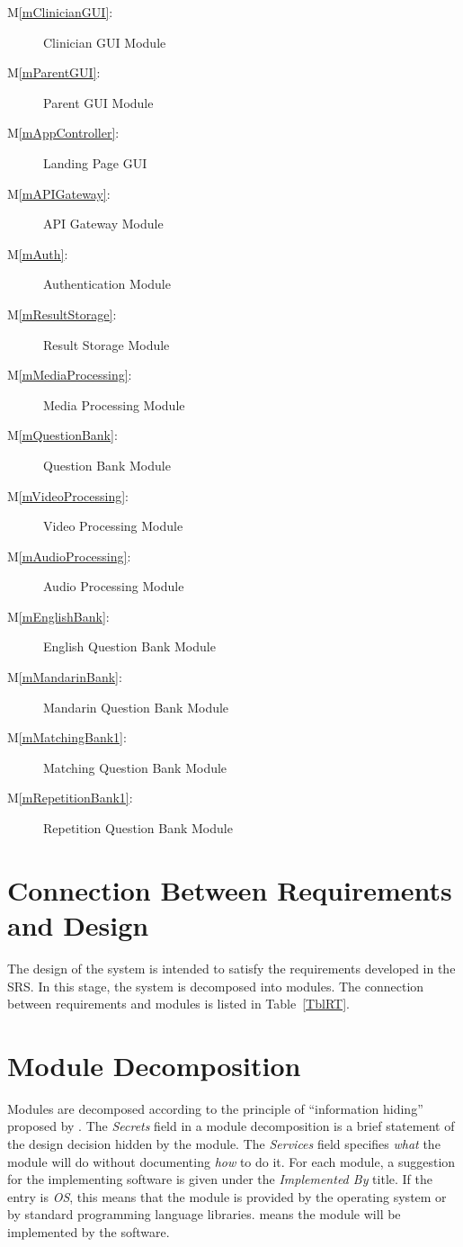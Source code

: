 \documentclass[12pt, titlepage]{article}
\newcommand{\mref}[1]{M\ref{#1}}
\begin{document}
\begin{multicols}{2}
  \begin{description}
    \item [\mref{mClinicianGUI}:] Clinician GUI Module
    \item [\mref{mParentGUI}:]   Parent GUI Module
    \item [\mref{mAppController}:] Landing Page GUI
    \item [\mref{mAPIGateway}:]  API Gateway Module
    \item [\mref{mAuth}:]        Authentication Module
    \item [\mref{mResultStorage}:] Result Storage Module
    \item [\mref{mMediaProcessing}:] Media Processing Module
    \item [\mref{mQuestionBank}:] Question Bank Module
    \item [\mref{mVideoProcessing}:] Video Processing Module
    \item [\mref{mAudioProcessing}:] Audio Processing Module
    \item [\mref{mEnglishBank}:] English Question Bank Module
    \item [\mref{mMandarinBank}:] Mandarin Question Bank Module
    \item [\mref{mMatchingBank1}:] Matching Question Bank Module
    \item [\mref{mRepetitionBank1}:] Repetition Question Bank Module
  \end{description}
\end{multicols}
  

\section{Connection Between Requirements and Design} \label{SecConnection}

The design of the system is intended to satisfy the requirements developed in
the SRS. In this stage, the system is decomposed into modules. The connection
between requirements and modules is listed in Table~\ref{TblRT}.

\section{Module Decomposition} \label{SecMD}

Modules are decomposed according to the principle of ``information hiding''
proposed by \citet{ParnasEtAl1984}. The \emph{Secrets} field in a module
decomposition is a brief statement of the design decision hidden by the
module. The \emph{Services} field specifies \emph{what} the module will do
without documenting \emph{how} to do it. For each module, a suggestion for the
implementing software is given under the \emph{Implemented By} title. If the
entry is \emph{OS}, this means that the module is provided by the operating
system or by standard programming language libraries.  \emph{\progname{}} means the
module will be implemented by the \progname{} software.
\end{document}
